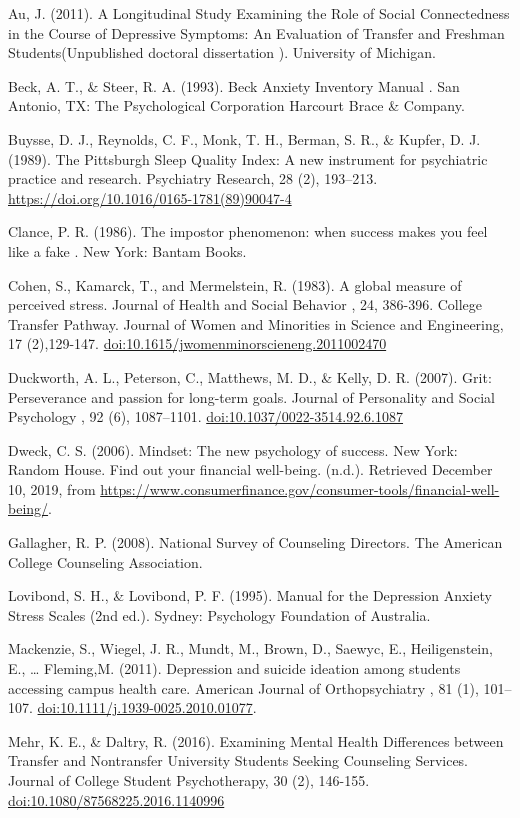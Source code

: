 \documentclass[]{book}
\begin{document}
Au, J. (2011). A Longitudinal Study Examining the Role of Social Connectedness in the Course
of Depressive Symptoms: An Evaluation of Transfer and Freshman
Students(Unpublished doctoral dissertation ). University of Michigan.

Beck, A. T., \& Steer, R. A. (1993). Beck Anxiety Inventory Manual . San Antonio, TX: The
Psychological Corporation Harcourt Brace \& Company.

Buysse, D. J., Reynolds, C. F., Monk, T. H., Berman, S. R., \& Kupfer, D. J. (1989). The
Pittsburgh Sleep Quality Index: A new instrument for psychiatric practice and research.
Psychiatry Research, 28 (2), 193--213. \url{https://doi.org/10.1016/0165-1781(89)90047-4}

Clance, P. R. (1986). The impostor phenomenon: when success makes you feel like a fake . New
York: Bantam Books.

Cohen, S., Kamarck, T., and Mermelstein, R. (1983). A global measure of perceived stress.
Journal of Health and Social Behavior , 24, 386-396.
College Transfer Pathway. Journal of Women and Minorities in Science and Engineering, 17 (2),129-147. \url{doi:10.1615/jwomenminorscieneng.2011002470}

Duckworth, A. L., Peterson, C., Matthews, M. D., \& Kelly, D. R. (2007). Grit: Perseverance and passion for long-term goals. Journal of Personality and Social Psychology , 92 (6),
1087--1101. \url{doi:10.1037/0022-3514.92.6.1087}

Dweck, C. S. (2006). Mindset: The new psychology of success. New York: Random House.
Find out your financial well-being. (n.d.). Retrieved December 10, 2019, from
\url{https://www.consumerfinance.gov/consumer-tools/financial-well-being/}.

Gallagher, R. P. (2008). National Survey of Counseling Directors. The American College
Counseling Association.

Lovibond, S. H., \& Lovibond, P. F. (1995). Manual for the Depression Anxiety Stress Scales
(2nd ed.). Sydney: Psychology Foundation of Australia.

Mackenzie, S., Wiegel, J. R., Mundt, M., Brown, D., Saewyc, E., Heiligenstein, E., \ldots{} Fleming,M. (2011). Depression and suicide ideation among students accessing campus health
care. American Journal of Orthopsychiatry , 81 (1), 101--107. \url{doi:10.1111/j.1939-0025.2010.01077}.

Mehr, K. E., \& Daltry, R. (2016). Examining Mental Health Differences between Transfer and
Nontransfer University Students Seeking Counseling Services. Journal of College
Student Psychotherapy, 30 (2), 146-155. \url{doi:10.1080/87568225.2016.1140996}
\end{document}

